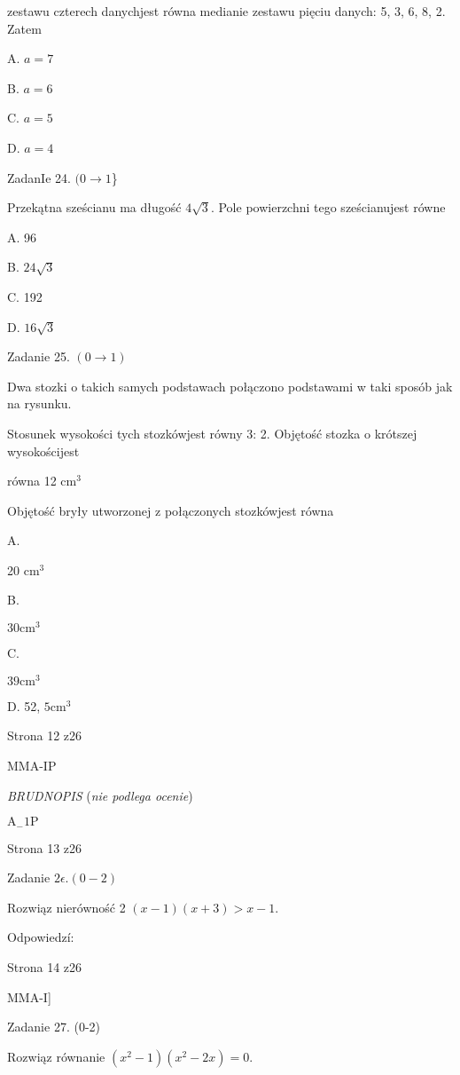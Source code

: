 \documentclass[a4paper,12pt]{article}
\begin{document}
zestawu czterech danychjest równa medianie zestawu pięciu danych: 5, 3, 6, 8, 2. Zatem

A. $a=7$

B. $a=6$

C. $a=5$

D. $a=4$

ZadanIe 24. $(0\rightarrow 1$\}

Przekątna sześcianu ma długość $4\sqrt{3}$. Pole powierzchni tego sześcianujest równe

A. 96

B. $24\sqrt{3}$

C. 192

D. $16\sqrt{3}$

Zadanie 25. $(0\rightarrow 1)$

Dwa stozki o takich samych podstawach połączono podstawami w taki sposób jak na rysunku.

Stosunek wysokości tych stozkówjest równy 3: 2. Objętość stozka o krótszej wysokościjest

równa 12 $\mathrm{c}\mathrm{m}^{3}$

Objętość bryły utworzonej z połączonych stozkówjest równa

A.

20 $\mathrm{c}\mathrm{m}^{3}$

B.

$30\mathrm{c}\mathrm{m}^{3}$

C.

$39\mathrm{c}\mathrm{m}^{3}$

D. 52, $5\mathrm{c}\mathrm{m}^{3}$

Strona 12 z26

MMA-IP





{\it BRUDNOPIS} ({\it nie podlega ocenie})

$\mathrm{A}_{-}1\mathrm{P}$

Strona 13 z26





Zadanie $2\epsilon. (0-2)$

Rozwiąz nierówność 2 $(x-1)(x+3)>x-1.$

Odpowiedzí:

Strona 14 z26

MMA-I]





Zadanie 27. (0-2)

Rozwiąz równanie $(x^{2}-1)(x^{2}-2x)=0.$
\end{document}
